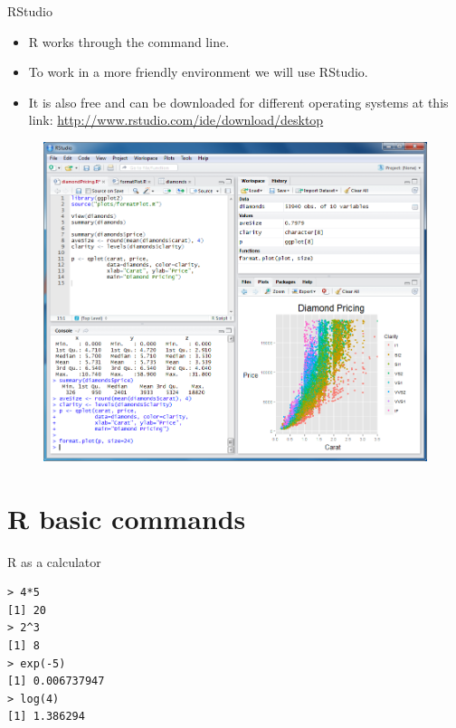\documentclass[handout]{beamer}
\begin{document}
\begin{frame}{RStudio}
\scriptsize{
\begin{itemize}
  \item R works through the command line.
 \item To work in a more friendly environment we will use RStudio.
 \item It is also free and can be downloaded for different operating systems at this link: \url{http://www.rstudio.com/ide/download/desktop}
\end{itemize}

} 

\begin{figure}[h!]
	\centering
	\includegraphics[scale=0.2]{pics/rstudio.png}
\end{figure}

 
\end{frame}


\section{R basic commands}

\begin{frame}[fragile]{R as a calculator}
\begin{verbatim}
> 4*5
[1] 20
> 2^3
[1] 8
> exp(-5)
[1] 0.006737947
> log(4)
[1] 1.386294
\end{verbatim}


 
\end{frame}
\end{document}
